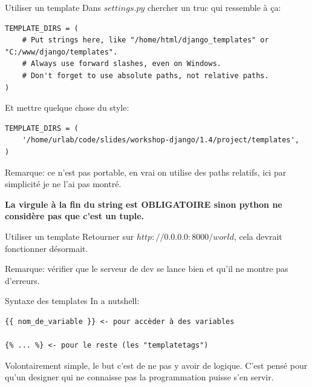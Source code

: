 \documentclass{beamer}
\begin{document}
\begin{frame}[fragile]{Utiliser un template}
    Dans $settings.py$ chercher un truc qui ressemble à ça:

\begin{footnotesize}
    \begin{verbatim}
TEMPLATE_DIRS = (
    # Put strings here, like "/home/html/django_templates" or "C:/www/django/templates".
    # Always use forward slashes, even on Windows.
    # Don't forget to use absolute paths, not relative paths.
)
    \end{verbatim}
\end{footnotesize}\pause

Et mettre quelque chose du style:

\begin{footnotesize}
\begin{verbatim}
TEMPLATE_DIRS = (
    '/home/urlab/code/slides/workshop-django/1.4/project/templates',
)
\end{verbatim}
\end{footnotesize}\pause

Remarque: ce n'est pas portable, en vrai on utilise des paths relatifs, ici par simplicité je ne l'ai pas montré.\pause

\vspace{3mm}
\bf La virgule à la fin du string est OBLIGATOIRE sinon python ne considère pas que c'est un tuple.

\end{frame}

\begin{frame}[fragile]{Utiliser un template}
    Retourner sur $http://0.0.0.0:8000/world$, cela devrait fonctionner désormait.

    Remarque: vérifier que le serveur de dev se lance bien et qu'il ne montre pas d'erreurs.
\end{frame}

\begin{frame}[fragile]{Syntaxe des templates}
    In a nutshell:

\begin{verbatim}
{{ nom_de_variable }} <- pour accèder à des variables

{% ... %} <- pour le reste (les "templatetags")
\end{verbatim}

Volontairement simple, le but c'est de ne pas y avoir de logique. C'est pensé pour qu'un designer qui ne connaisse pas la programmation puisse s'en servir.
\end{frame}
\end{document}
